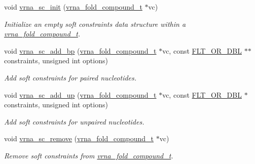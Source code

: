 \begin{DoxyCompactItemize}
\item 
void \hyperlink{group__soft__constraints_ga9d977a1681356778cc66dceafbe5b032}{vrna\+\_\+sc\+\_\+init} (\hyperlink{group__fold__compound_ga1b0cef17fd40466cef5968eaeeff6166}{vrna\+\_\+fold\+\_\+compound\+\_\+t} $\ast$vc)
\begin{DoxyCompactList}\small\item\em Initialize an empty soft constraints data structure within a \hyperlink{group__fold__compound_ga1b0cef17fd40466cef5968eaeeff6166}{vrna\+\_\+fold\+\_\+compound\+\_\+t}. \end{DoxyCompactList}\item 
void \hyperlink{group__soft__constraints_ga86049d4bb0ea8674cae9b6177156b184}{vrna\+\_\+sc\+\_\+add\+\_\+bp} (\hyperlink{group__fold__compound_ga1b0cef17fd40466cef5968eaeeff6166}{vrna\+\_\+fold\+\_\+compound\+\_\+t} $\ast$vc, const \hyperlink{group__data__structures_ga31125aeace516926bf7f251f759b6126}{F\+L\+T\+\_\+\+O\+R\+\_\+\+D\+B\+L} $\ast$$\ast$constraints, unsigned int options)
\begin{DoxyCompactList}\small\item\em Add soft constraints for paired nucleotides. \end{DoxyCompactList}\item 
void \hyperlink{group__soft__constraints_ga30f30c8eff9676775a3e831d972b5284}{vrna\+\_\+sc\+\_\+add\+\_\+up} (\hyperlink{group__fold__compound_ga1b0cef17fd40466cef5968eaeeff6166}{vrna\+\_\+fold\+\_\+compound\+\_\+t} $\ast$vc, const \hyperlink{group__data__structures_ga31125aeace516926bf7f251f759b6126}{F\+L\+T\+\_\+\+O\+R\+\_\+\+D\+B\+L} $\ast$constraints, unsigned int options)
\begin{DoxyCompactList}\small\item\em Add soft constraints for unpaired nucleotides. \end{DoxyCompactList}\item 
void \hyperlink{group__soft__constraints_ga73cdc07b9a199c614367bebef0f2c41a}{vrna\+\_\+sc\+\_\+remove} (\hyperlink{group__fold__compound_ga1b0cef17fd40466cef5968eaeeff6166}{vrna\+\_\+fold\+\_\+compound\+\_\+t} $\ast$vc)
\begin{DoxyCompactList}\small\item\em Remove soft constraints from \hyperlink{group__fold__compound_ga1b0cef17fd40466cef5968eaeeff6166}{vrna\+\_\+fold\+\_\+compound\+\_\+t}. \end{DoxyCompactList}\item 
$$
\end{DoxyCompactItemize}
